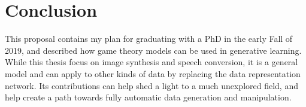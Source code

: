\documentclass{article}
\begin{document}



\section{Conclusion}
\label{Sec:Con}

This proposal contains my plan for graduating with a PhD in the early Fall of 2019, and described how game theory models can be used in generative learning. While this thesis focus on image synthesis and speech conversion, it is a general model and can apply to other kinds of data by replacing the data representation network. Its contributions can help shed a light to a much unexplored field, and help create a path towards fully automatic data generation and manipulation.



\end{document}

